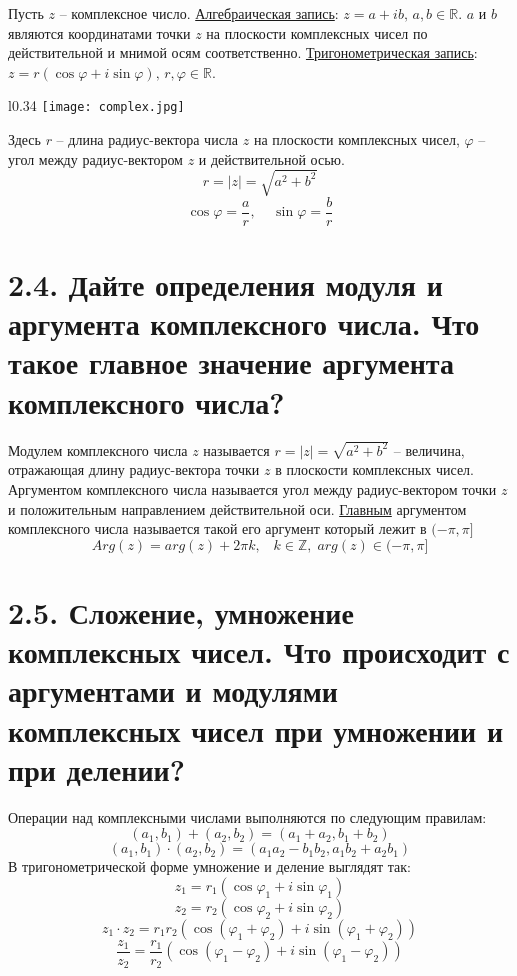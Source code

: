 \documentclass{article}
\begin{document}
Пусть $z$ -- комплексное число.
\newline \underline{Алгебраическая запись}: $z = a + ib,\, a,b \in \mathbb{R}$.
\newline $a$ и $b$ являются координатами точки $z$ на плоскости комплексных чисел по действительной и мнимой осям соответственно.
\newline \underline{Тригонометрическая запись}: $z = r(\cos{\varphi} + i\sin{\varphi}),\, r, \varphi \in \mathbb{R}$.
\newline 
\begin{wrapfigure}{l}{0.34\textwidth}
    \centering
    \texttt{[image: complex.jpg]}
\end{wrapfigure} Здесь $r$ -- длина радиус-вектора числа $z$ на плоскости комплексных чисел, $\varphi$ -- угол между радиус-вектором $z$ и действительной осью.
$$r = |z| = \sqrt{a^2 + b^2}$$
$$\cos{\varphi} = \frac{a}{r}, \;\;\;\; \sin{\varphi} = \frac{b}{r}$$

\section*{\LARGE 2.4. Дайте определения модуля и аргумента комплексного числа. Что такое главное значение аргумента комплексного числа? }

Модулем комплексного числа $z$ называется $r = |z| = \sqrt{a^2 + b^2}$ -- величина, отражающая длину радиус-вектора точки $z$ в плоскости комплексных чисел.
\newline Аргументом комплексного числа называется угол между радиус-вектором точки $z$ и положительным направлением действительной оси. \underline{Главным} аргументом комплексного числа называется такой его аргумент который лежит в $(-\pi, \pi]$
$$ Arg(z) = arg(z) + 2\pi k,\;\;\; k \in \mathbb{Z},\; arg(z) \in (-\pi, \pi]$$

\section*{\LARGE 2.5. Сложение, умножение комплексных чисел. Что происходит с аргументами и модулями комплексных чисел при умножении и при делении? }

Операции над комплексными числами выполняются по следующим правилам:
$$ (a_1, b_1) + (a_2, b_2) = (a_1 + a_2, b_1 + b_2) $$
$$ (a_1, b_1) \cdot (a_2, b_2) = (a_1a_2 - b_1b_2, a_1b_2 + a_2b_1) $$
В тригонометрической форме умножение и деление выглядят так:
$$ z_1 = r_1(\cos{\varphi_1} + i\sin{\varphi_1}) $$
$$ z_2 = r_2(\cos{\varphi_2} + i\sin{\varphi_2}) $$
$$ z_1 \cdot z_2 = r_1r_2(\cos{(\varphi_1 + \varphi_2)} + i\sin{(\varphi_1 + \varphi_2)}) $$
$$ \frac{z_1}{z_2} = \frac{r_1}{r_2}(\cos{(\varphi_1 - \varphi_2)} + i\sin{(\varphi_1 - \varphi_2)}) $$
\end{document}

